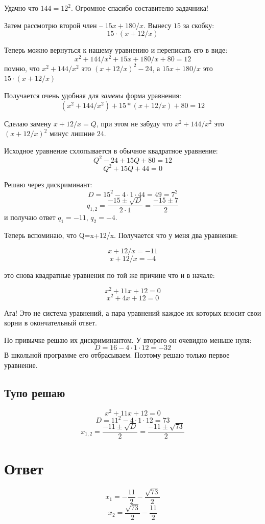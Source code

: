 \documentclass{article}
\begin{document}
Удачно что ${144=12^2}$. Огромное спасибо составителю задачника!

Затем рассмотрю второй член -- ${15x+180/x}$. Вынесу $15$ за скобку:
$$15\cdot(x+12/x)$$

Теперь можно вернуться к нашему уравнению и переписать его в виде:
$$ x^2+144/x^2+15x+180/x+80=12 $$
помню, что $x^2+144/x^2$ это $(x+12/x)^2-24$, а $15x+180/x$ это $15\cdot(x+12/x)$

Получается очень удобная для \textit{замены} форма уравнения:
$$ (x^2+144/x^2)+15*(x+12/x)+80=12 $$

Сделаю замену ${x+12/x=Q}$, при этом не забуду что $ x^2+144/x^2$ это $(x+12/x)^2$ минус лишние $24$.

\begin{samepage}
Исходное уравнение схлопывается в обычное квадратное уравнение:
$$Q^2-24+15Q+80=12$$
$$Q^2+15Q+44=0$$

Решаю через дискриминант:
$$D=15^2-4\cdot 1 \cdot 44=49=7^2$$
$$q_{1,2}=\frac{-15\pm \sqrt{D}}{2\cdot 1}=\frac{-15\pm 7}{2}$$
и получаю ответ $q_1=-11$, $q_2=-4$.
\end{samepage}

Теперь вспоминаю, что Q=x+12/x. Получается что у меня два уравнения:

$$ x+12/x=-11 $$
$$ x+12/x= -4 $$

это снова квадратные уравнения по той же причине что и в начале:

$$ x^2+11x+12=0 $$
$$ x^2+4x+12=0 $$

Ага! Это не система уравнений, а пара уравнений каждое их которых вносит свои корни в окончательный ответ.

По привычке решаю их дискриминантом. У второго он очевидно меньше нуля:
$${D=16-4\cdot{}1\cdot{}12=-32}$$
В школьной программе его отбрасываем. Поэтому решаю только первое уравнение.

\subsection{Тупо решаю}
$$x^2+11x+12=0 $$
$$D=11^2-4\cdot{}1{}\cdot{}12=73$$
$$x_{1,2}=\frac{-11\pm{}\sqrt{D}}{2}=\frac{-11\pm \sqrt{73}}{2}$$

\section{Ответ}
$$x_1=-\frac{11}{2}-\frac{\sqrt{73}}{2}$$
$$x_2=\frac{\sqrt{73}}{2}-\frac{11}{2}$$
\end{document}
